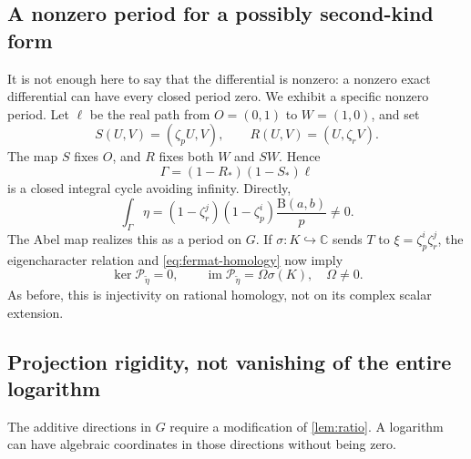 \documentclass[11pt,a4paper]{article}
\numberwithin{equation}{section}
\theoremstyle{definition}
\theoremstyle{remark}
\newcommand{\C}{\mathbb C}
\newcommand{\B}{\mathrm B}
\newcommand{\im}{\operatorname{im}}
\begin{document}
\subsection{A nonzero period for a possibly second-kind form}
It is not enough here to say that the differential is nonzero: a nonzero
exact differential can have every closed period zero. We exhibit a
specific nonzero period.
Let $\ell$ be the real path from $O=(0,1)$ to $W=(1,0)$, and set
\[
 S(U,V)=(\zeta_pU,V),\qquad R(U,V)=(U,\zeta_rV).
\]
The map $S$ fixes $O$, and $R$ fixes both $W$ and $SW$. Hence
\[
 \Gamma=(1-R_*)(1-S_*)\ell
\]
is a closed integral cycle avoiding infinity. Directly,
\begin{equation}\label{eq:fermat-nonzero-period}
 \int_\Gamma\eta
 =(1-\zeta_r^j)(1-\zeta_p^i)\frac{\B(a,b)}p\ne0.
\end{equation}
The Abel map realizes this as a period on $G$. If $\sigma:K\hookrightarrow
\C$ sends $T$ to $\xi=\zeta_p^i\zeta_r^j$, the eigencharacter relation and
\eqref{eq:fermat-homology} now imply
\begin{equation}\label{eq:generalized-period-map}
 \ker\mathcal P_{\widetilde\eta}=0,
 \qquad\im\mathcal P_{\widetilde\eta}=\Omega\sigma(K),\quad\Omega\ne0.
\end{equation}
As before, this is injectivity on rational homology, not on its complex
scalar extension.

\subsection{Projection rigidity, not vanishing of the entire logarithm}
The additive directions in $G$ require a modification of
\cref{lem:ratio}. A logarithm can have algebraic coordinates in those
directions without being zero.
\end{document}
